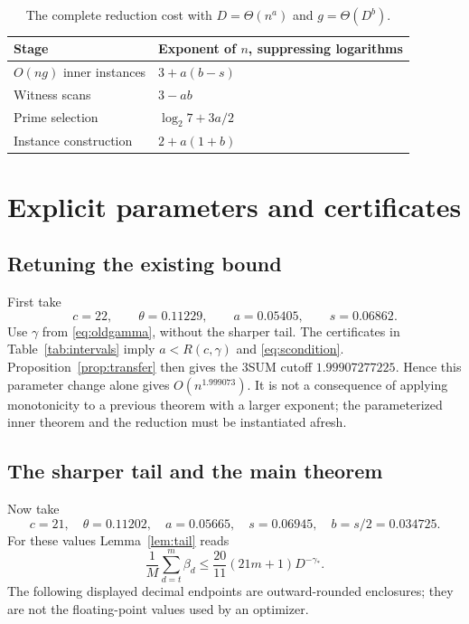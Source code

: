 \documentclass[11pt,a4paper]{article}
\theoremstyle{remark}
\newcommand{\gam}{\gamma_{\!*}}
\begin{document}
\begin{table}[htbp]
\centering
\begin{tabular}{@{}ll@{}}
\toprule
Stage & Exponent of $n$, suppressing logarithms\\
\midrule
$O(ng)$ inner instances & $3+a(b-s)$\\
Witness scans & $3-ab$\\
Prime selection & $\log_2 7+3a/2$\\
Instance construction & $2+a(1+b)$\\
\bottomrule
\end{tabular}
\caption{The complete reduction cost with $D=\Theta(n^a)$ and
$g=\Theta(D^b)$.}\label{tab:costs}
\end{table}

\section{Explicit parameters and certificates}\label{sec:parameters}

\subsection{Retuning the existing bound}
First take
\[
 c=22,\qquad\theta=0.11229,\qquad a=0.05405,\qquad s=0.06862.
\]
Use $\gamma$ from \eqref{eq:oldgamma}, without the sharper tail. The
certificates in Table~\ref{tab:intervals} imply $a<R(c,\gamma)$ and
\eqref{eq:scondition}. Proposition~\ref{prop:transfer} then gives the
3SUM cutoff $1.99907277225$. Hence this parameter change alone gives
$O(n^{1.999073})$. It is not a consequence of applying monotonicity to a
previous theorem with a larger exponent; the parameterized inner theorem
and the reduction must be instantiated afresh.

\subsection{The sharper tail and the main theorem}
Now take
\begin{equation}\label{eq:parameters}
 c=21,\quad\theta=0.11202,\quad a=0.05665,\quad
 s=0.06945,\quad b=s/2=0.034725.
\end{equation}
For these values Lemma~\ref{lem:tail} reads
\[
 \frac1M\sum_{d=t}^m\beta_d
 \leq\frac{20}{11}(21m+1)D^{-\gam}.
\]
The following displayed decimal endpoints are outward-rounded enclosures;
they are not the floating-point values used by an optimizer.
\end{document}
